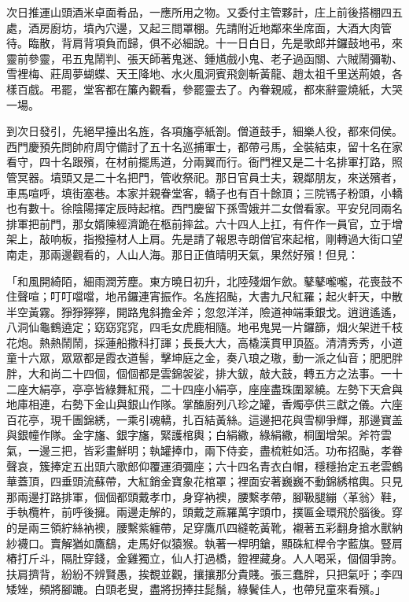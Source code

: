次日推運山頭酒米卓面肴品，一應所用之物。又委付主管夥計，庄上前後搭棚四五處，酒房廚坊，墳內穴邊，又起三間罩棚。先請附近地鄰來坐席面，大酒大肉管待。臨散，背肩背項負而歸，俱不必細說。十一日白日，先是歌郎并鑼鼓地弔，來靈前參靈，弔五鬼鬧判、張天師著鬼迷、鍾馗戲小鬼、老子過函關、六賊鬧彌勒、雪裡梅、莊周夢蝴蝶、天王降地、水火風洞賓飛劍斬黃龍、趙太祖千里送荊娘，各樣百戲。弔罷，堂客都在簾內觀看，參罷靈去了。內眷親戚，都來辭靈燒紙，大哭一場。

到次日發引，先絕早擡出名旌，各項旛亭紙劄。僧道鼓手，細樂人役，都來伺侯。西門慶預先問帥府周守備討了五十名巡捕軍士，都帶弓馬，全裝結束，留十名在家看守，四十名跟殯，在材前擺馬道，分兩翼而行。衙門裡又是二十名排軍打路，照管冥器。墳頭又是二十名把門，管收祭祀。那日官員士夫，親鄰朋友，來送殯者，車馬喧呼，填街塞巷。本家并親眷堂客，轎子也有百十餘頂；三院駂子粉頭，小轎也有數十。徐陰陽擇定辰時起棺。西門慶留下孫雪娥并二女僧看家。平安兒同兩名排軍把前門，那女婿陳經濟跪在柩前摔盆。六十四人上扛，有仵作一員官，立于增架上，敲响板，指撥擡材人上肩。先是請了報恩寺朗僧官來起棺，剛轉過大街口望南走，那兩邊觀看的，人山人海。那日正值晴明天氣，果然好殯！但見：

「和風開綺陌，細雨潤芳塵。東方曉日初升，北陸殘烟乍歛。鼕鼕嚨嚨，花喪鼓不住聲喧；叮叮噹噹，地吊鑼連宵振作。名旌招颭，大書九尺紅羅；起火軒天，中散半空黃霧。猙猙獰獰，開路鬼斜擔金斧；忽忽洋洋，險道神端秉銀戈。逍逍遙遙，八洞仙龜鶴遶定；窈窈窕窕，四毛女虎鹿相隨。地弔鬼晃一片鑼篩，烟火架迸千枝花炮。熱熱鬧鬧，採蓮船撒科打諢；長長大大，高橇漢貫甲頂盔。清清秀秀，小道童十六眾，眾眾都是霞衣道髻，擊坤庭之金，奏八琅之璈，動一派之仙音；肥肥胖胖，大和尚二十四個，個個都是雲錦袈娑，排大鈸，敲大鼓，轉五方之法事。一十二座大絹亭，亭亭皆綠舞紅飛，二十四座小絹亭，座座盡珠圍翠繞。左勢下天倉與地庫相連，右勢下金山與銀山作隊。掌醢廚列八珍之罐，香燭亭供三獻之儀。六座百花亭，現千團錦綉，一乘引魂轎，扎百結黃絲。這邊把花與雪柳爭輝，那邊寶盖與銀幢作隊。金字旛、銀字旛，緊護棺輿；白絹繖，綠絹繖，桐圍增架。斧符雲氣，一邊三把，皆彩畫鮮明；執罐捧巾，兩下侍妾，盡梳粧如活。功布招颭，孝眷聲哀，簇捧定五出頭六歌郎仰覆運須彌座；六十四名青衣白帽，穩穩抬定五老雲鶴華蓋頂，四垂頭流蘇帶，大紅銷金寶象花棺罩；裡面安著巍巍不動錦綉棺輿。只見那兩邊打路排軍，個個都頭戴孝巾，身穿衲襖，腰繫孝帶，腳靸腿繃〈革翁〉鞋，手執欖杵，前呼後擁。兩邊走解的，頭戴芝蔴羅萬字頭巾，撲匾金環飛於腦後。穿的是兩三領紵絲衲襖，腰繫紫纏帶，足穿鷹爪四縫乾黃靴，襯著五彩翻身搶水獸納紗襪口。賣解猶如鷹鷂，走馬好似猿猴。執著一桿明鎗，顯硃紅桿令字藍旗。豎肩樁打斤斗，隔肚穿錢，金雞獨立，仙人打過橋，鐙裡藏身。人人喝采，個個爭誇。扶肩擠背，紛紛不辨賢愚，挨覩並觀，攘攘那分貴賤。張三蠢胖，只把氣吁；李四矮矬，頻將腳蹗。白頭老叟，盡將拐捧拄髭鬚，綠鬢佳人，也帶兒童來看殯。」

